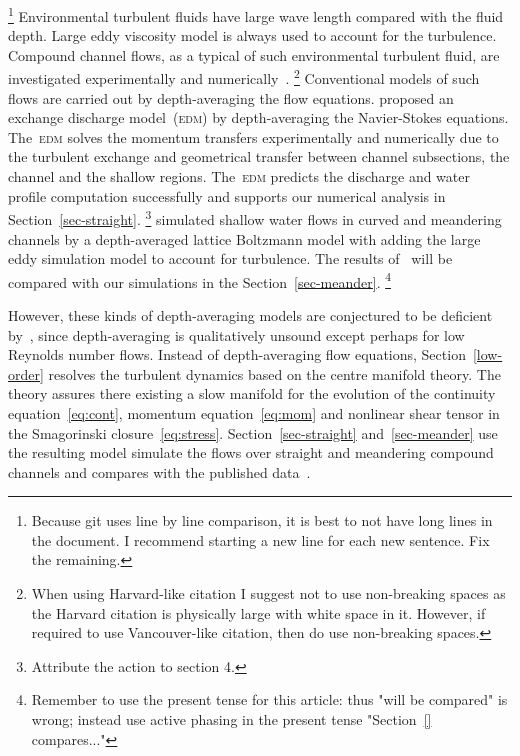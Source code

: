 \documentclass[12pt,a5paper]{article}
\begin{document}
\footnote{Because git uses line by line comparison, it is best to not have long lines in the document.  I recommend starting a new line for each new sentence.  Fix the remaining.}
Environmental turbulent fluids have large wave length compared with the fluid depth.
Large eddy viscosity model is always used to account for the turbulence.
Compound channel flows, as a typical of such environmental turbulent fluid, are investigated experimentally and numerically~\cite[e.g.]{Bousmar2002,Liu2009,Demuren1993}.
\footnote{When using Harvard-like citation I suggest not to use non-breaking spaces as the Harvard citation is physically large with white space in it.  However, if required to use Vancouver-like citation, then do use non-breaking spaces.}
Conventional models of such flows are carried out by depth-averaging the flow equations. 
\cite{Bousmar2002} proposed an exchange discharge model~(\textsc{edm}) by depth-averaging the Navier-Stokes equations.
The~\textsc{edm} solves the momentum transfers experimentally and numerically due to the turbulent exchange and geometrical transfer between channel subsections, the channel and the shallow regions.
The~\textsc{edm} predicts the discharge and water profile computation successfully and supports our numerical analysis in Section~\ref{sec-straight}. 
\footnote{Attribute the action to section 4.}
\cite{Liu2009} simulated shallow water flows in curved and meandering channels by a depth-averaged lattice Boltzmann model with adding the large eddy simulation model to account for turbulence.
The results of~\cite{Liu2009} will be compared with our simulations in the Section~\ref{sec-meander}. 
\footnote{Remember to use the present tense for this article: thus "will be compared" is wrong; instead use active phasing in the present tense "Section~\ref{} compares..."}

However, these kinds of depth-averaging models are conjectured to be deficient by~\cite{Roberts1996}, since depth-averaging is qualitatively unsound except perhaps for low Reynolds number flows.
Instead of depth-averaging flow equations, Section~\ref{low-order} resolves the turbulent dynamics based on the centre manifold theory. 
The theory assures there existing a slow manifold for the evolution of the continuity equation~\eqref{eq:cont}, momentum equation~\eqref{eq:mom} and nonlinear shear tensor in the Smagorinski closure~\eqref{eq:stress}.
Section~\ref{sec-straight} and~\ref{sec-meander} use the resulting model simulate the flows over straight and meandering compound channels and compares with the published data~\cite[e.g.]{Bousmar2002,Liu2009}.
\end{document}
